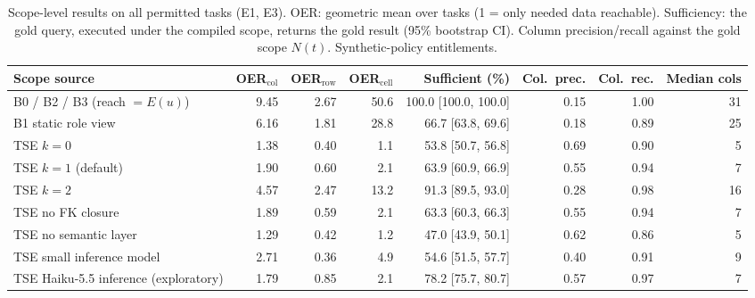 \begin{table}[t]\centering\caption{Scope-level results on all permitted tasks (E1, E3). OER: geometric mean over tasks (1 = only needed data reachable). Sufficiency: the gold query, executed under the compiled scope, returns the gold result (95\% bootstrap CI). Column precision/recall against the gold scope $N(t)$. Synthetic-policy entitlements.}\label{tab:e1}
\footnotesize\begin{tabular}{lrrrrrrr}\hline
\textbf{Scope source} & \textbf{OER$_\mathrm{col}$} & \textbf{OER$_\mathrm{row}$} & \textbf{OER$_\mathrm{cell}$} & \textbf{Sufficient (\%)} & \textbf{Col.\ prec.} & \textbf{Col.\ rec.} & \textbf{Median cols} \\\hline
B0 / B2 / B3 (reach $=E(u)$) & 9.45 & 2.67 & 50.6 & 100.0 [100.0, 100.0] & 0.15 & 1.00 & 31 \\
B1 static role view & 6.16 & 1.81 & 28.8 & 66.7 [63.8, 69.6] & 0.18 & 0.89 & 25 \\
TSE $k{=}0$ & 1.38 & 0.40 & 1.1 & 53.8 [50.7, 56.8] & 0.69 & 0.90 & 5 \\
TSE $k{=}1$ (default) & 1.90 & 0.60 & 2.1 & 63.9 [60.9, 66.9] & 0.55 & 0.94 & 7 \\
TSE $k{=}2$ & 4.57 & 2.47 & 13.2 & 91.3 [89.5, 93.0] & 0.28 & 0.98 & 16 \\
TSE no FK closure & 1.89 & 0.59 & 2.1 & 63.3 [60.3, 66.3] & 0.55 & 0.94 & 7 \\
TSE no semantic layer & 1.29 & 0.42 & 1.2 & 47.0 [43.9, 50.1] & 0.62 & 0.86 & 5 \\
TSE small inference model & 2.71 & 0.36 & 4.9 & 54.6 [51.5, 57.7] & 0.40 & 0.91 & 9 \\
TSE Haiku-5.5 inference (exploratory) & 1.79 & 0.85 & 2.1 & 78.2 [75.7, 80.7] & 0.57 & 0.97 & 7 \\
\hline\end{tabular}\end{table}
